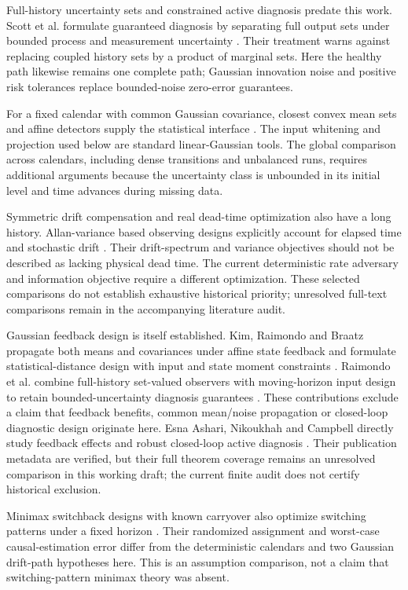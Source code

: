 \documentclass[11pt]{article}
\begin{document}
Full-history uncertainty sets and constrained active diagnosis predate this work.
Scott et al. formulate guaranteed diagnosis by separating full output sets under
bounded process and measurement uncertainty \cite{zonotope}.
Their treatment warns against replacing coupled history sets by a product of
marginal sets. Here the healthy path likewise remains one complete path;
Gaussian innovation noise and positive risk tolerances replace bounded-noise
zero-error guarantees.

For a fixed calendar with common Gaussian covariance, closest convex mean sets
and affine detectors supply the statistical interface \cite{convex}.
The input whitening and projection used below are standard linear-Gaussian
tools. The global comparison across calendars, including dense transitions
and unbalanced runs, requires additional arguments because the uncertainty
class is unbounded in its initial level and time advances during missing data.

Symmetric drift compensation and real dead-time optimization also have a long
history. Allan-variance based observing designs explicitly account for elapsed
time and stochastic drift \cite{allan}.
Their drift-spectrum and variance objectives should not be described as lacking
physical dead time. The current deterministic rate adversary and information
objective require a different optimization. These selected comparisons do not
establish exhaustive historical priority; unresolved full-text comparisons remain
in the accompanying literature audit.


Gaussian feedback design is itself established. Kim, Raimondo and Braatz
propagate both means and covariances under affine state feedback and formulate
statistical-distance design with input and state moment constraints \cite{kim}.
Raimondo et al. combine full-history set-valued observers with moving-horizon
input design to retain bounded-uncertainty diagnosis guarantees \cite{closedset}.
These contributions exclude a claim that feedback benefits, common mean/noise
propagation or closed-loop diagnostic design originate here.
Esna Ashari, Nikoukhah and Campbell directly study feedback effects and robust
closed-loop active diagnosis \cite{feedback2012,robustfeedback2012}.
Their publication metadata are verified, but their full theorem coverage remains
an unresolved comparison in this working draft; the current finite audit does
not certify historical exclusion.

Minimax switchback designs with known carryover also optimize switching patterns
under a fixed horizon \cite{switchback}. Their randomized assignment and
worst-case causal-estimation error differ from the deterministic calendars and
two Gaussian drift-path hypotheses here. This is an assumption comparison,
not a claim that switching-pattern minimax theory was absent.
\end{document}
